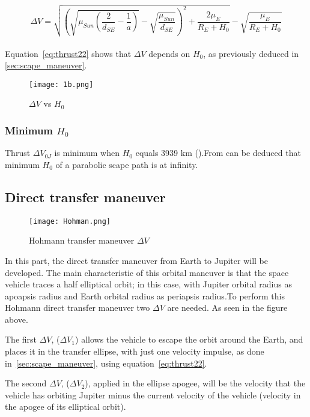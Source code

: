 \begin{equation}\label{eq:thrust22}
\Delta V=\sqrt{\left(\sqrt{\mu_{Sun}\left(\frac{2}{d_{SE}}-\frac{1}{a}\right)}-\sqrt{\frac{\mu_{Sun}}{d_{SE}}}\right)^2+\frac{2\mu_E}{R_E+H_0}}-\sqrt{\frac{\mu_E}{R_E+H_0}}
\end{equation}
\paragraph{}
Equation~\ref{eq:thrust22} shows that $\Delta V$ depends on $H_0$, as previously deduced in \ref{sec:scape_maneuver}.

\begin{figure}[H]
	\centering
		\texttt{[image: 1b.png]}
	\caption{$\Delta V$ vs $H_0$}
	\label{fig:1b}
\end{figure}

\subsubsection{Minimum $H_0$}
Thrust $\Delta V_{0J}$ is minimum when $H_0$ equals 3939 km ().From  can be deduced that minimum $H_0$ of a parabolic scape path is at infinity.

\subsection{Direct transfer maneuver}

\begin{figure}[H]
	\centering
		\texttt{[image: Hohman.png]}
	\caption{Hohmann transfer maneuver $\Delta V$}
	\label{fig:Hohmann}
\end{figure}

In this part, the direct transfer maneuver from Earth to Jupiter will be developed. The main characteristic of this orbital maneuver is that the space vehicle traces a half elliptical orbit; in this case, with Jupiter orbital radius as apoapsis radius and Earth orbital radius as periapsis radius.To perform this Hohmann direct transfer maneuver two $\Delta V$ are needed. As seen in the figure above.  

The first $\Delta V$, ($\Delta V_1$) allows the vehicle to escape the orbit around the Earth, and places it in the transfer ellipse, with just one velocity impulse, as done in~\ref{sec:scape_maneuver}, using equation~\ref{eq:thrust22}. 

The second $\Delta V$, ($\Delta V_2$), applied in the ellipse apogee, will be the velocity that the vehicle has orbiting Jupiter minus the current velocity of the vehicle (velocity in the apogee of its elliptical orbit).

